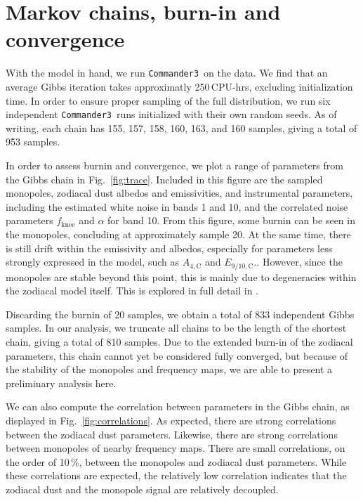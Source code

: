 \documentclass{aa}
\def\commanderthree{\texttt{Commander3}}
\begin{document}


\section{Markov chains, burn-in and convergence}
\label{sec:chains}


With the model in hand, we run \commanderthree\ on the data. We find that an average Gibbs iteration takes approximatly 250\,CPU-hrs, excluding initialization time. In order to ensure proper sampling of the full distribution, we run six independent \commanderthree\ runs initialized with their own random seeds. As of writing, each chain has 155, 157, 158, 160, 163, and 160 samples, giving a total of 953 samples.


In order to assess burnin and convergence, we plot a range of parameters from the Gibbs chain in Fig.~\ref{fig:trace}. Included in this figure are the sampled monopoles, zodiacal dust albedos and emissivities, and instrumental parameters, including the estimated white noise in bands 1 and 10, and the correlated noise parameters $f_\mathrm{knee}$ and $\alpha$ for band 10. From this figure, some burnin can be seen in the monopoles, concluding at approximately sample 20.  At the same time, there is still drift within the emissivity and albedos, especially for parameters less strongly expressed in the model, such as $A_{4,\mathrm C}$ and $E_{9/10,\mathrm C}$.. However, since the monopoles are stable beyond this point, this is mainly due to degeneracies within the zodiacal model itself. This is explored in full detail in \citet{CG02_02}.

Discarding the burnin of 20 samples, we obtain a total of 833 independent Gibbs samples. In our analysis, we truncate all chains to be the length of the shortest chain, giving a total of 810 samples. Due to the extended burn-in of the zodiacal parameters, this chain cannot yet be considered fully converged, but because of the stability of the monopoles and frequency maps, we are able to present a preliminary analysis here. 

We can also compute the correlation between parameters in the Gibbs chain, as displayed in Fig.~\ref{fig:correlations}.  As expected, there are strong correlations between the zodiacal dust parameters. Likewise, there are strong correlations between monopoles of nearby frequency maps. There are small correlations, on the order of 10\,\%, between the monopoles and zodiacal dust parameters. While these correlations are expected, the relatively low correlation indicates that the zodiacal dust and the monopole signal are relatively decoupled.
\end{document}
